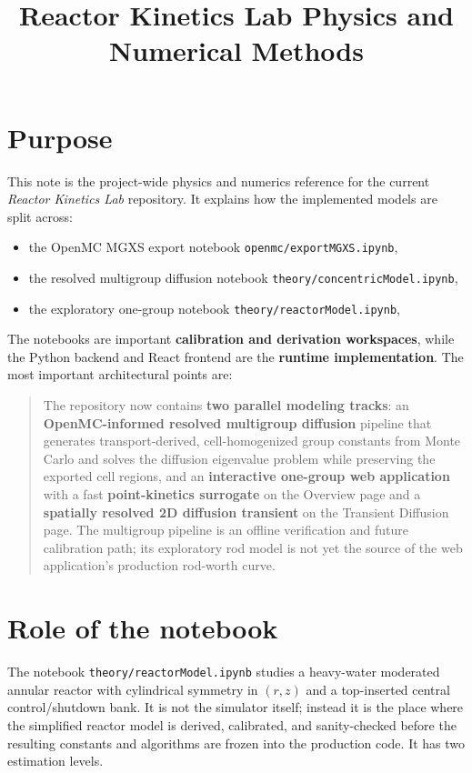 \documentclass[11pt]{article}
\title{Reactor Kinetics Lab Physics and Numerical Methods}
\author{}
\date{}
\begin{document}
\maketitle

\section{Purpose}

This note is the project-wide physics and numerics reference for the current
\emph{Reactor Kinetics Lab} repository.  It explains how the implemented models
are split across:
\begin{itemize}
  \item the OpenMC MGXS export notebook \texttt{openmc/exportMGXS.ipynb},
  \item the resolved multigroup diffusion notebook
        \texttt{theory/concentricModel.ipynb},
  \item the exploratory one-group notebook \texttt{theory/reactorModel.ipynb},
\end{itemize}

The notebooks are important \textbf{calibration and derivation workspaces}, while
the Python backend and React frontend are the \textbf{runtime implementation}.
The most important architectural points are:

\begin{quote}
The repository now contains \textbf{two parallel modeling tracks}: an
\textbf{OpenMC-informed resolved multigroup diffusion} pipeline that generates
transport-derived, cell-homogenized group constants from Monte Carlo and solves
the diffusion eigenvalue problem while preserving the exported cell regions,
and an \textbf{interactive one-group web application} with a fast
\textbf{point-kinetics surrogate} on the Overview page and a
\textbf{spatially resolved 2D diffusion transient} on the Transient Diffusion
page.  The multigroup pipeline is an offline verification and future
calibration path; its exploratory rod model is not yet the source of the web
application's production rod-worth curve.
\end{quote}

\section{Role of the notebook}

The notebook \texttt{theory/reactorModel.ipynb} studies a heavy-water moderated
annular reactor with cylindrical symmetry in $(r,z)$ and a top-inserted central
control/shutdown bank.  It is not the simulator itself; instead it is the place
where the simplified reactor model is derived, calibrated, and sanity-checked
before the resulting constants and algorithms are frozen into the production
code.  It has two estimation levels.
\end{document}

